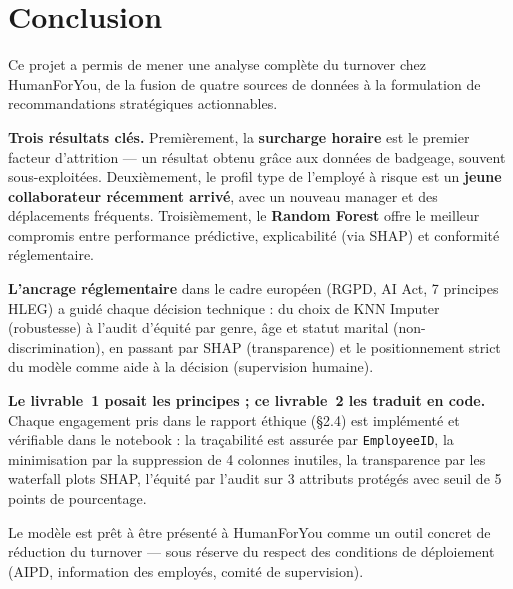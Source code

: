 \documentclass[12pt,a4paper]{article}
\begin{document}
\section{Conclusion}

Ce projet a permis de mener une analyse complète du turnover chez HumanForYou, de la fusion de quatre sources de données à la formulation de recommandations stratégiques actionnables.

\textbf{Trois résultats clés.} Premièrement, la \textbf{surcharge horaire} est le premier facteur d'attrition --- un résultat obtenu grâce aux données de badgeage, souvent sous-exploitées. Deuxièmement, le profil type de l'employé à risque est un \textbf{jeune collaborateur récemment arrivé}, avec un nouveau manager et des déplacements fréquents. Troisièmement, le \textbf{Random Forest} offre le meilleur compromis entre performance prédictive, explicabilité (via SHAP) et conformité réglementaire.

\textbf{L'ancrage réglementaire} dans le cadre européen (RGPD, AI Act, 7 principes HLEG) a guidé chaque décision technique : du choix de KNN Imputer (robustesse) à l'audit d'équité par genre, âge et statut marital (non-discrimination), en passant par SHAP (transparence) et le positionnement strict du modèle comme aide à la décision (supervision humaine).

\textbf{Le livrable~1 posait les principes ; ce livrable~2 les traduit en code.} Chaque engagement pris dans le rapport éthique (§2.4) est implémenté et vérifiable dans le notebook : la traçabilité est assurée par \texttt{EmployeeID}, la minimisation par la suppression de 4 colonnes inutiles, la transparence par les waterfall plots SHAP, l'équité par l'audit sur 3 attributs protégés avec seuil de 5 points de pourcentage.

Le modèle est prêt à être présenté à HumanForYou comme un outil concret de réduction du turnover --- sous réserve du respect des conditions de déploiement (AIPD, information des employés, comité de supervision).
\end{document}
